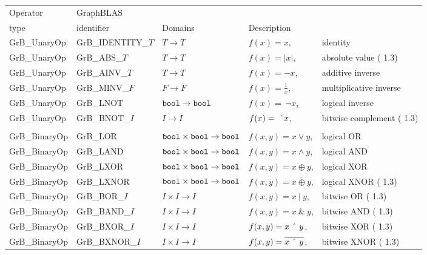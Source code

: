\documentclass[11pt]{article}
\begin{document}
\hspace*{-3em}
\begin{tabular}{l|l|l|ll} \hline
Operator & GraphBLAS             &                                                              & \\
type     & identifier            & Domains                                              & Description \\ \hline
{\sf GrB\_UnaryOp}    & {\sf GrB\_IDENTITY\_$T$} & $T \rightarrow T $     & $f(x) = x$, &identity \\
{\sf GrB\_UnaryOp}    & {\sf GrB\_ABS\_$T$}      & $T \rightarrow T $     & $f(x) = |x|$, &absolute value ({\color{red} 1.3})\\
{\sf GrB\_UnaryOp}    & {\sf GrB\_AINV\_$T$}     & $T \rightarrow T $     & $f(x) = -x$, &additive inverse \\
{\sf GrB\_UnaryOp}    & {\sf GrB\_MINV\_$F$}     & $F \rightarrow F $     & $f(x) = \frac{1}{x}$, &multiplicative inverse \\
{\sf GrB\_UnaryOp}    & {\sf GrB\_LNOT}          & ${\tt bool} \rightarrow {\tt bool}$  & $f(x) =~\neg x$, &logical inverse  \\
{\sf GrB\_UnaryOp}    & {\sf GrB\_BNOT\_$I$}      & $I \rightarrow I$  & $f(x) =~\mbox{\~{}} x$, &bitwise complement ({\color{red} 1.3})\\

&&&\\
{\sf GrB\_BinaryOp}   & {\sf GrB\_LOR}        & ${\tt bool} \times {\tt bool} \rightarrow {\tt bool}$ & $f(x,y) = x \lor y$, & logical OR \\
{\sf GrB\_BinaryOp}   & {\sf GrB\_LAND}       & ${\tt bool} \times {\tt bool} \rightarrow {\tt bool}$ & $f(x,y) = x \land y$, & logical AND \\
{\sf GrB\_BinaryOp}   & {\sf GrB\_LXOR}       & ${\tt bool} \times {\tt bool} \rightarrow {\tt bool}$ & $f(x,y) = x \oplus y$, & logical XOR \\
{\sf GrB\_BinaryOp}   & {\sf GrB\_LXNOR}      & ${\tt bool} \times {\tt bool} \rightarrow {\tt bool}$ & $f(x,y) = \overline{x \oplus y}$, & logical XNOR ({\color{red} 1.3})\\

{\sf GrB\_BinaryOp}   & {\sf GrB\_BOR\_$I$}   & $I \times I \rightarrow I$ & $f(x,y) = x ~|~ y$, & bitwise OR ({\color{red} 1.3})\\
{\sf GrB\_BinaryOp}   & {\sf GrB\_BAND\_$I$}  & $I \times I \rightarrow I$ & $f(x,y) = x ~\&~ y$, & bitwise AND ({\color{red} 1.3})\\
{\sf GrB\_BinaryOp}   & {\sf GrB\_BXOR\_$I$}  & $I \times I \rightarrow I$ & $f(x,y) = x ~\mbox{\^{}}~ y$, & bitwise XOR ({\color{red} 1.3})\\
{\sf GrB\_BinaryOp}   & {\sf GrB\_BXNOR\_$I$} & $I \times I \rightarrow I$ & $f(x,y) = \overline{x ~\mbox{\^{}}~ y}$, & bitwise XNOR ({\color{red} 1.3})\\


\end{tabular}
\end{document}
